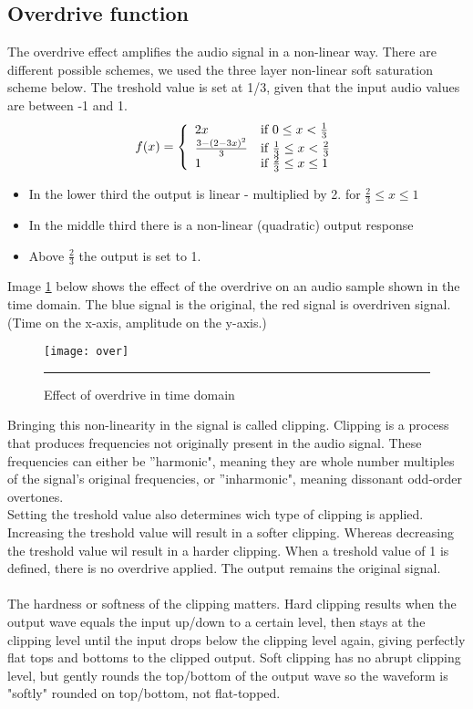 \subsection{Overdrive function}
The overdrive effect amplifies the audio signal in a non-linear way. There are different possible schemes, we used the three layer non-linear soft saturation scheme below. The treshold value is set at 1/3, given that the input audio values are between -1 and 1. 
\[ f(x) = \left\{
\begin{array}{ll}
2x & \mbox{if $0 \leq x < \frac{1}{3}$}\\
\frac{3-(2-3x)^{2}}{3} & \mbox{if $ \frac{1}{3} \leq x < \frac{2}{3}$}\\
1 & \mbox{if $ \frac{2}{3} \leq x \leq 1$}
\end{array} \right. \]
\begin{itemize}
\item In the lower third the output is linear - multiplied by 2. for $\frac{2}{3} \leq x \leq 1$
\item In the middle third there is a non-linear (quadratic) output response
\item Above $\frac{2}{3}$ the output is set to 1. 
\end{itemize}
Image \ref{fig:over} below shows the effect of the overdrive on an audio sample shown in the time domain. The blue signal is the original, the red signal is overdriven signal. (Time on the x-axis, amplitude on the y-axis.)
\begin{figure}[htbp]
\centering
\texttt{[image: over]}
\rule{30em}{0.5pt}
\caption{Effect of overdrive in time domain}
\label{fig:over}
\end{figure}
Bringing this non-linearity in the signal is called clipping. Clipping is a process that produces frequencies not originally present in the audio signal. 
These frequencies can either be ''harmonic", meaning they are whole number multiples of the signal's original frequencies, or ''inharmonic", meaning dissonant odd-order overtones. \\
Setting the treshold value also determines wich type of clipping is applied. Increasing the treshold value will result in a softer clipping. Whereas decreasing the treshold value wil result in a harder clipping. When a treshold value of 1 is defined, there is no overdrive applied. The output remains the original signal. \\ \\
The hardness or softness of the clipping matters. Hard clipping results when the output wave equals the input up/down to a certain level, then stays at the clipping level until the input drops below the clipping level again, giving perfectly flat tops and bottoms to the clipped output. Soft clipping has no abrupt clipping level, but gently rounds the top/bottom of the output wave so the waveform is "softly" rounded on top/bottom, not flat-topped.\\
